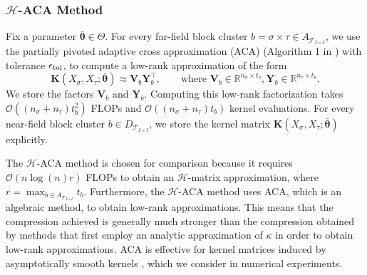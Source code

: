 \documentclass[final,3p,times]{elsarticle}
\newcommand{\mc}[1]{\mathcal{#1}}
\renewcommand{\vec}[1]{\boldsymbol{#1}}
\newcommand{\mat}[1]{\boldsymbol{#1}}
\newcommand{\R}{\mathbb{R}}
\begin{document}
\subsubsection{\texorpdfstring{$\mc{H}$}{}-ACA Method}\label{sssec:H-ACA}
Fix a parameter $\bar{\vec{\theta}} \in \Theta$.  For every far-field block cluster $b =\sigma \times \tau \in A_{\mc{T}_{I \times I}} $, we use the partially pivoted adaptive cross approximation (ACA) (Algorithm 1 in \cite{liu2020parallel}) with tolerance $\epsilon_{\rm{tol}}$, to compute a low-rank approximation of the form
\begin{equation}\label{eqn:h-aca}
\mat{K}({X}_{\sigma}, {X}_{\tau}; \bar{\vec{\theta}}) \approx \mat{V}_{b} \mat{Y}^{\top}_b, \qquad \text{where } \mat{V}_{b} \in \R^{n_{\sigma} \times t_b}, \mat{Y}_{b} \in \R^{n_{\tau} \times t_{b}}.
\end{equation}
We store the factors $\mat{V}_{b}$ and $\mat{Y}_{b}$. Computing this low-rank factorization takes $\mc{O}((n_{\sigma} + n_{\tau})t_{b}^2)$ FLOPs and $\mc{O}((n_{\sigma} + n_{\tau})t_{b})$ kernel evaluations. For every near-field block cluster $b  \in D_{\mc{T}_{I \times I}}$, we store the kernel matrix $\mat{K}({X}_{\sigma}, {X}_{\tau}; \bar{\vec{\theta}})$ explicitly. 


The $\mc{H}$-ACA method is chosen for comparison because it requires $\mc{O}(n\log(n)r)$ FLOPs to obtain an $\mc{H}$-matrix approximation, where $r = \max_{b \in A_{\mc{T}_{I \times I}}}t_{b}$. Furthermore, the $\mc{H}$-ACA method uses ACA, which is an algebraic method, to obtain low-rank approximations. This means that the compression achieved is generally much stronger than the compression obtained by methods that first employ an analytic approximation of $\kappa$ in order to obtain low-rank approximations.  ACA is effective for kernel matrices induced by asymptotically smooth kernels \cite{borm2005hybrid}, which we consider in numerical experiments. 
\end{document}
